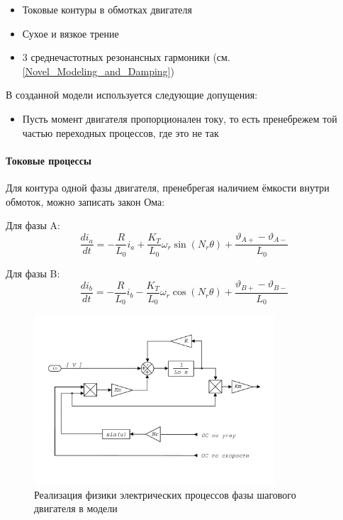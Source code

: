 \begin{itemize}
    \item Токовые контуры в обмотках двигателя
    \item Сухое и вязкое трение
    \item 3 среднечастотных резонансных гармоники (см. \ref{Novel_Modeling_and_Damping})
\end{itemize}

В созданной модели используется следующие допущения:

\begin{itemize}
    \item Пусть момент двигателя пропорционален току, то есть пренебрежем той частью переходных
            процессов, где это не так
\end{itemize}

\paragraph{ Токовые процессы }
Для контура одной фазы двигателя, пренебрегая наличием ёмкости внутри обмоток, можно записать
закон Ома:

Для фазы A:
\begin{equation}
    \frac{di_{a}}{dt} =
        - \frac{R}{L_{0}} i_{a}
        + \frac{K_{T}}{L_{0}} \omega_{r} \sin(N_{r}\theta)
        + \frac{\vartheta_{A+} - \vartheta_{A-}}{L_{0}}
\end{equation}

Для фазы B:
\begin{equation}
    \frac{di_{b}}{dt} =
        - \frac{R}{L_{0}} i_{b}
        - \frac{K_{T}}{L_{0}} \omega_{r} \cos(N_{r}\theta)
        + \frac{\vartheta_{B+} - \vartheta_{B-}}{L_{0}}
\end{equation}
\begin{figure}[ht!]
    \centering
    \includegraphics[width=0.8\textwidth, keepaspectratio]
                    {./src/pictures/drive_model/drive_model_current_equation}
    \caption{Реализация физики электрических процессов фазы шагового двигателя в модели}
    \label{pic_drive_model_current_equation}
\end{figure}

